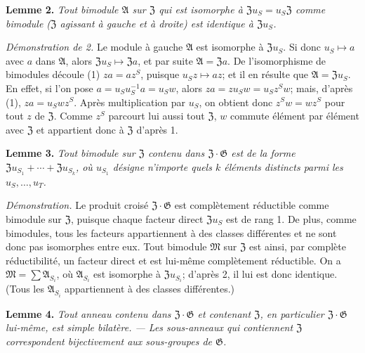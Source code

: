 \noindent\textbf{Lemme 2.} \emph{Tout bimodule \(\mathfrak A\) sur \(\mathfrak Z\) qui est isomorphe à \(\mathfrak Zu_S=u_S\mathfrak Z\) comme bimodule (\(\mathfrak Z\) agissant à gauche et à droite) est identique à \(\mathfrak Zu_S\).}

\noindent\emph{Démonstration de 2.} Le module à gauche \(\mathfrak A\) est isomorphe à \(\mathfrak Zu_S\). Si donc \(u_S\mapsto a\) avec \(a\) dans \(\mathfrak A\), alors \(\mathfrak Zu_S\mapsto\mathfrak Za\), et par suite \(\mathfrak A=\mathfrak Za\). De l'isomorphisme de bimodules découle (1) \(za=az^S\), puisque \(u_Sz\mapsto az\); et il en résulte que \(\mathfrak A=\mathfrak Zu_S\). En effet, si l'on pose \(a=u_Su_S^{-1}a=u_Sw\), alors \(za=zu_Sw=u_Sz^Sw\); mais, d'après (1), \(za=u_Swz^S\). Après multiplication par \(u_S\), on obtient donc \(z^Sw=wz^S\) pour tout \(z\) de \(\mathfrak Z\). Comme \(z^S\) parcourt lui aussi tout \(\mathfrak Z\), \(w\) commute élément par élément avec \(\mathfrak Z\) et appartient donc à \(\mathfrak Z\) d'après 1.

\noindent\textbf{Lemme 3.} \emph{Tout bimodule sur \(\mathfrak Z\) contenu dans \(\mathfrak Z\cdot\mathfrak G\) est de la forme \(\mathfrak Zu_{S_1}+\cdots+\mathfrak Zu_{S_k}\), où \(u_{S_1}\) désigne n'importe quels \(k\) éléments distincts parmi les \(u_S,\ldots,u_T\).}

\noindent\emph{Démonstration.} Le produit croisé \(\mathfrak Z\cdot\mathfrak G\) est complètement réductible comme bimodule sur \(\mathfrak Z\), puisque chaque facteur direct \(\mathfrak Zu_S\) est de rang 1. De plus, comme bimodules, tous les facteurs appartiennent à des classes différentes et ne sont donc pas isomorphes entre eux. Tout bimodule \(\mathfrak M\) sur \(\mathfrak Z\) est ainsi, par complète réductibilité, un facteur direct et est lui-même complètement réductible. On a \(\mathfrak M=\sum\mathfrak A_{S_i}\), où \(\mathfrak A_{S_i}\) est isomorphe à \(\mathfrak Zu_{S_i}\); d'après 2, il lui est donc identique. (Tous les \(\mathfrak A_{S_i}\) appartiennent à des classes différentes.)

\noindent\textbf{Lemme 4.} \emph{Tout anneau contenu dans \(\mathfrak Z\cdot\mathfrak G\) et contenant \(\mathfrak Z\), en particulier \(\mathfrak Z\cdot\mathfrak G\) lui-même, est simple bilatère. --- Les sous-anneaux qui contiennent \(\mathfrak Z\) correspondent bijectivement aux sous-groupes de \(\mathfrak G\).}

